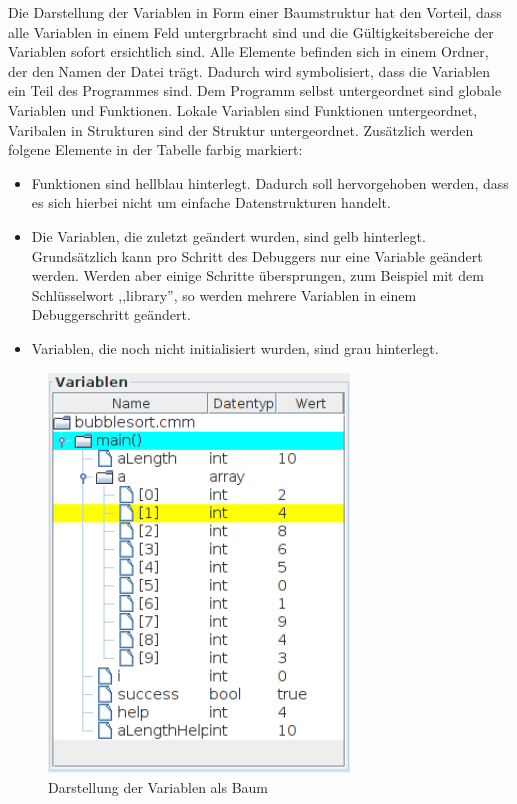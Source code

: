 Die Darstellung der Variablen in Form einer Baumstruktur hat den Vorteil, dass alle Variablen in einem Feld untergrbracht sind und die Gültigkeitsbereiche der Variablen sofort ersichtlich sind.
\newline
Alle Elemente befinden sich in einem Ordner, der den Namen der Datei trägt. Dadurch wird symbolisiert, dass die Variablen ein Teil des Programmes sind. Dem Programm selbst untergeordnet sind globale Variablen und Funktionen. Lokale Variablen sind Funktionen untergeordnet, Varibalen in Strukturen sind der Struktur untergeordnet.
\newline
Zusätzlich werden folgene Elemente in der Tabelle farbig markiert:
\begin{itemize}
\item Funktionen sind hellblau hinterlegt. Dadurch soll hervorgehoben werden, dass es sich hierbei nicht um einfache Datenstrukturen handelt.
\item Die Variablen, die zuletzt geändert wurden, sind gelb hinterlegt. Grundsätzlich kann pro Schritt des Debuggers nur eine Variable geändert werden. Werden aber einige Schritte übersprungen, zum Beispiel mit dem Schlüsselwort ,,library'', so werden mehrere Variablen in einem Debuggerschritt geändert.
\item Variablen, die noch nicht initialisiert wurden, sind grau hinterlegt.
\end{itemize}

\begin{figure}
\includegraphics[width=8cm]{./media/images/gui/var/treetable.png}
\caption{Darstellung der Variablen als Baum}
\end{figure}

